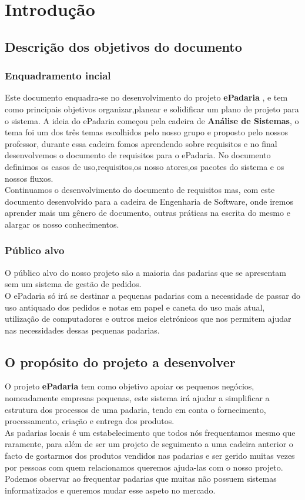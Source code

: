 \chapter{Introdução}
\label{introdução}
\section{Descrição dos objetivos do documento}
\subsection{Enquadramento incial}
Este documento enquadra-se no desenvolvimento do projeto \textbf{ePadaria} , e tem como principais objetivos organizar,planear e solidificar um plano de projeto para o sistema.
A ideia do ePadaria começou pela cadeira de \textbf{Análise de Sistemas}, o tema foi um dos três temas escolhidos pelo nosso grupo e proposto pelo nossos professor, durante essa cadeira fomos aprendendo sobre requisitos e no final desenvolvemos o documento de requisitos para o ePadaria. No documento definimos os casos de uso,requisitos,os nosso atores,os pacotes do sistema e os nossos fluxos.\\
Continuamos o desenvolvimento do documento de requisitos mas, com este documento desenvolvido para a cadeira de Engenharia de Software, onde iremos aprender mais um gênero de documento, outras práticas na escrita do mesmo e alargar os nosso conhecimentos.

\subsection{Público alvo}
O público alvo do nosso projeto são a maioria das padarias que se apresentam sem um sistema de gestão de pedidos.\\
O ePadaria só irá se destinar a pequenas padarias com a necessidade de passar do uso antiquado dos pedidos e notas em papel e caneta do uso mais atual, utilização de computadores e outros meios eletrónicos que nos permitem ajudar nas necessidades dessas pequenas padarias.

\section{O propósito do projeto a desenvolver}
O projeto \textbf{ePadaria} tem como objetivo apoiar os pequenos negócios, nomeadamente empresas pequenas, este sistema irá ajudar a simplificar a estrutura dos processos de uma padaria, tendo em conta o fornecimento, processamento, criação e entrega dos produtos.\\
As padarias locais é um estabelecimento que todos nós frequentamos mesmo que raramente, para além de ser um projeto de seguimento a uma cadeira anterior o facto de gostarmos dos produtos vendidos nas padarias e ser gerido muitas vezes por pessoas com quem relacionamos queremos ajuda-las com o nosso projeto. Podemos observar ao frequentar padarias que muitas não possuem sistemas informatizados e queremos mudar esse aspeto no mercado.
\\

